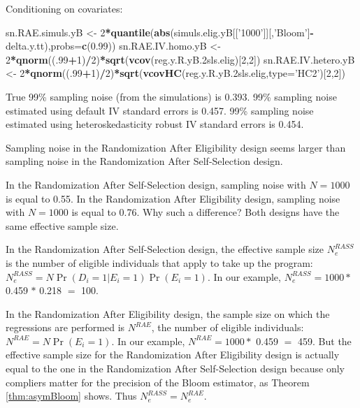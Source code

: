 \documentclass[]{book}
\newenvironment{Shaded}{\begin{snugshade}}{\end{snugshade}}
\newcommand{\KeywordTok}[1]{\textcolor[rgb]{0.13,0.29,0.53}{\textbf{#1}}}
\newcommand{\DataTypeTok}[1]{\textcolor[rgb]{0.13,0.29,0.53}{#1}}
\newcommand{\DecValTok}[1]{\textcolor[rgb]{0.00,0.00,0.81}{#1}}
\newcommand{\FloatTok}[1]{\textcolor[rgb]{0.00,0.00,0.81}{#1}}
\newcommand{\StringTok}[1]{\textcolor[rgb]{0.31,0.60,0.02}{#1}}
\newcommand{\OperatorTok}[1]{\textcolor[rgb]{0.81,0.36,0.00}{\textbf{#1}}}
\newcommand{\NormalTok}[1]{#1}
\theoremstyle{definition}
\theoremstyle{definition}
\theoremstyle{definition}
\theoremstyle{remark}
\let\BeginKnitrBlock\begin \let\EndKnitrBlock\end
\begin{document}
Conditioning on covariates:

\begin{Shaded}
\begin{Highlighting}[]
\NormalTok{sn.RAE.simuls.yB <-}\StringTok{ }\DecValTok{2}\OperatorTok{*}\KeywordTok{quantile}\NormalTok{(}\KeywordTok{abs}\NormalTok{(simuls.elig.yB[[}\StringTok{'1000'}\NormalTok{]][,}\StringTok{'Bloom'}\NormalTok{]}\OperatorTok{-}\NormalTok{delta.y.tt),}\DataTypeTok{probs=}\KeywordTok{c}\NormalTok{(}\FloatTok{0.99}\NormalTok{))}
\NormalTok{sn.RAE.IV.homo.yB <-}\StringTok{ }\DecValTok{2}\OperatorTok{*}\KeywordTok{qnorm}\NormalTok{((.}\DecValTok{99}\OperatorTok{+}\DecValTok{1}\NormalTok{)}\OperatorTok{/}\DecValTok{2}\NormalTok{)}\OperatorTok{*}\KeywordTok{sqrt}\NormalTok{(}\KeywordTok{vcov}\NormalTok{(reg.y.R.yB.2sls.elig)[}\DecValTok{2}\NormalTok{,}\DecValTok{2}\NormalTok{])}
\NormalTok{sn.RAE.IV.hetero.yB <-}\StringTok{ }\DecValTok{2}\OperatorTok{*}\KeywordTok{qnorm}\NormalTok{((.}\DecValTok{99}\OperatorTok{+}\DecValTok{1}\NormalTok{)}\OperatorTok{/}\DecValTok{2}\NormalTok{)}\OperatorTok{*}\KeywordTok{sqrt}\NormalTok{(}\KeywordTok{vcovHC}\NormalTok{(reg.y.R.yB.2sls.elig,}\DataTypeTok{type=}\StringTok{'HC2'}\NormalTok{)[}\DecValTok{2}\NormalTok{,}\DecValTok{2}\NormalTok{])}
\end{Highlighting}
\end{Shaded}

True 99\% sampling noise (from the simulations) is 0.393. 99\% sampling
noise estimated using default IV standard errors is 0.457. 99\% sampling
noise estimated using heteroskedasticity robust IV standard errors is
0.454.

\BeginKnitrBlock{remark}
\iffalse{} {Remark. } \fi{}Sampling noise in the Randomization After
Eligibility design seems larger than sampling noise in the Randomization
After Self-Selection design.
\EndKnitrBlock{remark} In the Randomization After Self-Selection design,
sampling noise with \(N=1000\) is equal to 0.55. In the Randomization
After Eligibility design, sampling noise with \(N=1000\) is equal to
0.76. Why such a difference? Both designs have the same effective sample
size.

In the Randomization After Self-Selection design, the effective sample
size \(N^{RASS}_e\) is the number of eligible individuals that apply to
take up the program: \(N^{RASS}_e=N\Pr(D_i=1|E_i=1)\Pr(E_i=1)\). In our
example, \(N^{RASS}_e=1000 *\) 0.459 \(*\) 0.218 \(=\) 100.

In the Randomization After Eligibility design, the sample size on which
the regressions are performed is \(N^{RAE}\), the number of eligible
individuals: \(N^{RAE}=N\Pr(E_i=1)\). In our example, \(N^{RAE}=1000 *\)
0.459 \(=\) 459. But the effective sample size for the Randomization
After Eligibility design is actually equal to the one in the
Randomization After Self-Selection design because only compliers matter
for the precision of the Bloom estimator, as Theorem \ref{thm:asymBloom}
shows. Thus \(N^{RASS}_e=N^{RAE}_e\).
\end{document}

